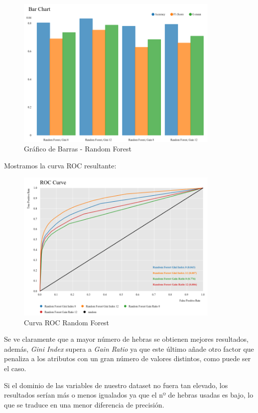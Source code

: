 	\begin{figure}[H]
		\centering
		\includegraphics[width=0.87\textwidth]{img/rfcom.png}
		\caption{Gráfico de Barras - Random Forest}
	\end{figure}

	
	Mostramos la curva ROC resultante:
	
	\begin{figure}[H]
		\centering
		\includegraphics[width=0.87\textwidth]{img/rfroc.png}
		\caption{Curva ROC Random Forest}
	\end{figure}
	
	Se ve claramente que a mayor número de hebras se obtienen mejores resultados, además, \textit{Gini Index} supera a \textit{Gain Ratio} ya que este último añade otro factor que penaliza a los atributos con un gran número de valores distintos, como puede ser el caso.
	
	Si el dominio de las variables de nuestro dataset no fuera tan elevado, los resultados serían más o menos igualados ya que el nº de hebras usadas es bajo, lo que se traduce en una menor diferencia de precisión.
	
